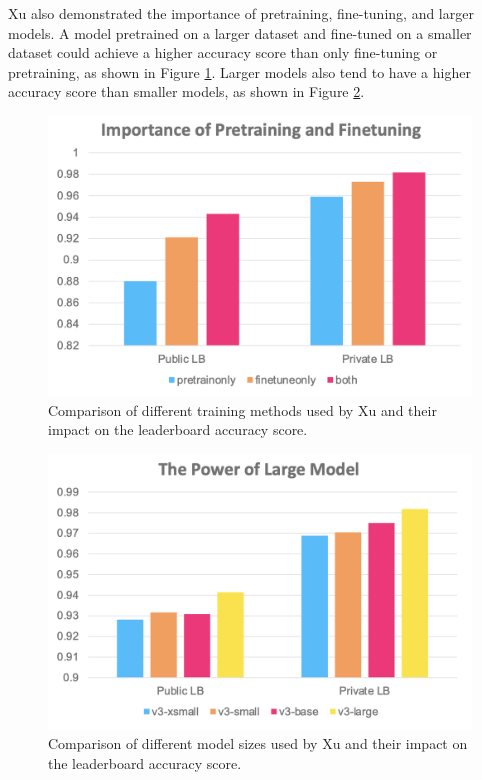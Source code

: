 \documentclass[conference]{IEEEtran}
\begin{document}
Xu also demonstrated the importance of pretraining, fine-tuning, and larger models. A model pretrained on a larger dataset and fine-tuned on a smaller dataset could achieve a higher accuracy score than only fine-tuning or pretraining, as shown in Figure \ref{fig:xu_bar_train}. Larger models also tend to have a higher accuracy score than smaller models, as shown in Figure \ref{fig:xu_bar_size}.

\begin{figure}[htbp]
  \centerline{\includegraphics[width=\columnwidth]{figs/xu_bar_train.png}}
  \caption{Comparison of different training methods used by Xu \cite{2ndplace} and their impact on the leaderboard accuracy score.}
  \label{fig:xu_bar_train}
\end{figure}

\begin{figure}[htbp]
  \centerline{\includegraphics[width=\columnwidth]{figs/xu_bar_size.png}}
  \caption{Comparison of different model sizes used by Xu \cite{2ndplace} and their impact on the leaderboard accuracy score.}
  \label{fig:xu_bar_size}
\end{figure}
\end{document}
